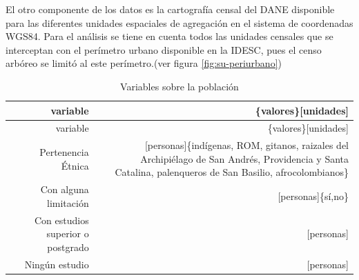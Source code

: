 \documentclass[12pt,]{book}
\begin{document}
El otro componente de los datos es la cartografía censal del DANE
\citep{geoportal_DANE} disponible para las diferentes unidades
espaciales de agregación en el sistema de coordenadas WGS84. Para el
análisis se tiene en cuenta todos las unidades censales que se
interceptan con el perímetro urbano disponible en la IDESC, pues el
censo arbóreo se limitó al este perímetro.(ver figura
\ref{fig:su-periurbano})

\begin{longtable}[]{@{}rr@{}}
\caption{\label{tab:vars-poblacion} Variables sobre la
población}\tabularnewline
\toprule
\begin{minipage}[b]{0.09\columnwidth}\raggedleft\strut
variable\strut
\end{minipage} & \begin{minipage}[b]{0.38\columnwidth}\raggedleft\strut
\{valores\}{[}unidades{]}\strut
\end{minipage}\tabularnewline
\midrule
\endfirsthead
\toprule
\begin{minipage}[b]{0.09\columnwidth}\raggedleft\strut
variable\strut
\end{minipage} & \begin{minipage}[b]{0.38\columnwidth}\raggedleft\strut
\{valores\}{[}unidades{]}\strut
\end{minipage}\tabularnewline
\midrule
\endhead
\begin{minipage}[t]{0.09\columnwidth}\raggedleft\strut
Pertenencia Étnica\strut
\end{minipage} & \begin{minipage}[t]{0.38\columnwidth}\raggedleft\strut
{[}personas{]}\{indígenas, ROM, gitanos, raizales del Archipiélago de
San Andrés, Providencia y Santa Catalina, palenqueros de San Basilio,
afrocolombianos\}\strut
\end{minipage}\tabularnewline
\begin{minipage}[t]{0.09\columnwidth}\raggedleft\strut
Con alguna limitación\strut
\end{minipage} & \begin{minipage}[t]{0.38\columnwidth}\raggedleft\strut
{[}personas{]}\{sí,no\}\strut
\end{minipage}\tabularnewline
\begin{minipage}[t]{0.09\columnwidth}\raggedleft\strut
Con estudios superior o postgrado\strut
\end{minipage} & \begin{minipage}[t]{0.38\columnwidth}\raggedleft\strut
{[}personas{]}\strut
\end{minipage}\tabularnewline
\begin{minipage}[t]{0.09\columnwidth}\raggedleft\strut
Ningún estudio\strut
\end{minipage} & \begin{minipage}[t]{0.38\columnwidth}\raggedleft\strut
{[}personas{]}\strut
\end{minipage}\tabularnewline
\bottomrule
\end{longtable}
\end{document}
